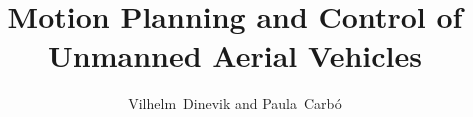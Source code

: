 \documentclass[journal]{IEEEtran}
\begin{document}
	\title{Motion Planning and Control of Unmanned Aerial Vehicles}
	\author{Vilhelm~Dinevik and Paula~Carb\'o}
		
	

	
	\maketitle
	
\end{document}
